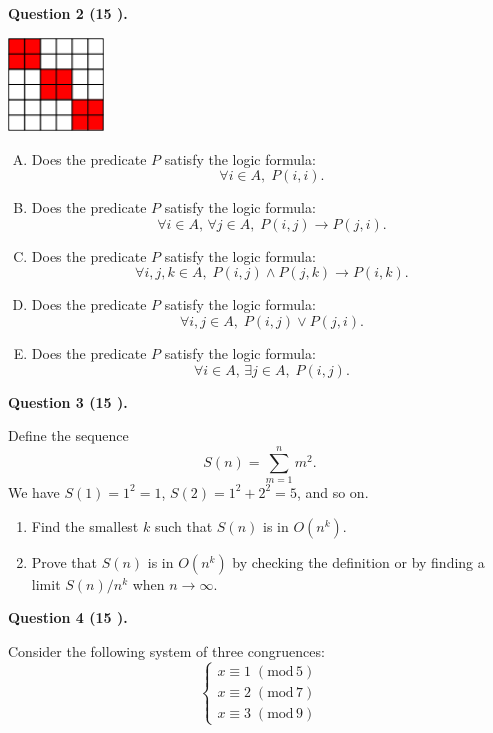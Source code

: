 \documentclass[jou]{apa6}
\begin{document}
\vspace{10pt}
{\bf Question 2 (15 \textperthousand{}).}


\begin{center}
\includegraphics[width=1.0in]{midterm/relation.png}
\end{center}

\begin{enumerate}[(A)]
\item Does the predicate $P$ satisfy the logic formula:
$$\forall i \in A,\;P(i,i).$$
\item Does the predicate $P$ satisfy the logic formula:
$$\forall i \in A,\,\forall j \in A,\;P(i,j) \rightarrow P(j,i).$$
\item Does the predicate $P$ satisfy the logic formula:
$$\forall i,j,k \in A,\;P(i,j) \wedge P(j,k) \rightarrow P(i,k).$$
\item Does the predicate $P$ satisfy the logic formula:
$$\forall i,j \in A,\;P(i,j) \vee P(j,i).$$
\item Does the predicate $P$ satisfy the logic formula:
$$\forall i \in A,\, \exists j \in A,\;P(i,j).$$
\end{enumerate}

\vspace{10pt}
{\bf Question 3 (15 \textperthousand{}).}

Define the sequence 
$$S(n) = \sum\limits_{m=1}^n m^2.$$
We have $S(1) = 1^2 = 1$, $S(2) = 1^2 + 2^2 = 5$, and so on. 

\begin{enumerate}
\item Find the smallest $k$ such that $S(n)$ is in $O(n^k)$. 
\item Prove that $S(n)$ is in $O(n^k)$ by checking the 
definition or by finding a limit $S(n)/n^k$ when $n \rightarrow \infty$. 
\end{enumerate}


\vspace{10pt}
{\bf Question 4 (15 \textperthousand{}).}

Consider the following system of three congruences:
$$\left\{ \begin{array}{l}
x \equiv 1\;(\text{mod}\,5)\\
x \equiv 2\;(\text{mod}\,7)\\
x \equiv 3\;(\text{mod}\,9) 
\end{array} \right.$$
\end{document}

